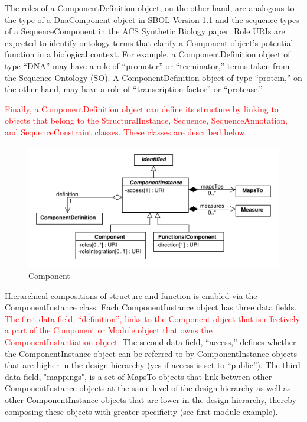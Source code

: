\documentclass[draftspec]{sbmlpkgspec}
\begin{document}
The roles of a ComponentDefinition object, on the other hand, are analogous to the type of a DnaComponent object in SBOL Version 1.1 and the sequence types of a SequenceComponent in the ACS Synthetic Biology paper. Role URIs are expected to identify ontology terms that clarify a Component object’s potential function in a biological context. For example, a ComponentDefinition object of type “DNA” may have a role of “promoter” or “terminator,” terms taken from the Sequence Ontology (SO). A ComponentDefinition object of type “protein,” on the other hand, may have a role of “transcription factor” or “protease.” 

\textcolor{red}{Finally, a ComponentDefinition object can define its structure by linking to objects that belong to the StructuralInstance, Sequence, SequenceAnnotation, and SequenceConstraint classes. These classes are described below.}

\begin{figure}[h]
\begin{center}
\includegraphics[width=\textwidth]{uml/component_instance}
\caption[]{Component}
\label{uml:component}
\end{center}
\end{figure}

Hierarchical compositions of structure and function is enabled via the ComponentInstance class. Each ComponentInstance object has three data fields. \textcolor{red}{The first data field, “definition”, links to the Component object that is effectively a part of the Component or Module object that owns the ComponentInstantiation object.} The second data field, “access,” defines whether the ComponentInstance object can be referred to by ComponentInstance objects that are higher in the design hierarchy (yes if access is set to “public”). The third data field, "mappings", is a set of MapsTo objects that link between other ComponentInstance objects at the same level of the design hierarchy as well as other ComponentInstance objects that are lower in the design hierarchy, thereby composing these objects with greater specificity (see first module example).
\end{document}
